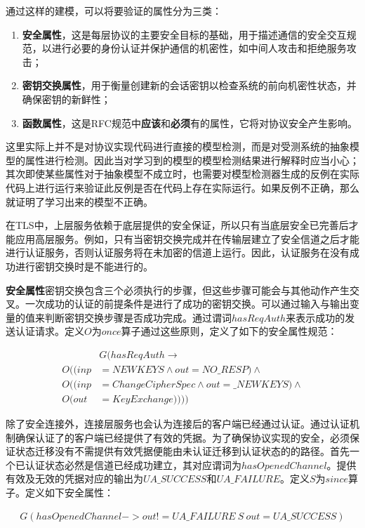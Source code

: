 通过这样的建模，可以将要验证的属性分为三类：
\begin{enumerate}
\item \textbf{安全属性}，这是每层协议的主要安全目标的基础，用于描述通信的安全交互规范，以进行必要的身份认证并保护通信的机密性，如中间人攻击和拒绝服务攻击；
\item \textbf{密钥交换属性}，用于衡量创建新的会话密钥以检查系统的前向机密性状态，并确保密钥的新鲜性；
\item \textbf{函数属性}，这是RFC规范中\textbf{应该}和\textbf{必须}有的属性，它将对协议安全产生影响。
\end{enumerate}

这里实际上并不是对协议实现代码进行直接的模型检测，而是对受测系统的抽象模型的属性进行检测。因此当对学习到的模型的模型检测结果进行解释时应当小心；其次即使某些属性对于抽象模型不成立时，也需要对模型检测器生成的反例在实际代码上进行运行来验证此反例是否在代码上存在实际运行。如果反例不正确，那么就证明了学习出来的模型不正确。

在TLS中，上层服务依赖于底层提供的安全保证，所以只有当底层安全已完善后才能应用高层服务。例如，只有当密钥交换完成并在传输层建立了安全信道之后才能进行认证服务，否则认证服务将在未加密的信道上运行。因此，认证服务在没有成功进行密钥交换时是不能进行的。

\textbf{安全属性}密钥交换包含三个必须执行的步骤，但这些步骤可能会与其他动作产生交叉。一次成功的认证的前提条件是进行了成功的密钥交换。可以通过输入与输出变量的值来判断密钥交换步骤是否成功完成。通过谓词$hasReqAuth$来表示成功的发送认证请求。定义$O$为$once$算子通过这些原则，定义了如下的安全属性规范：
\begin{PROPERTY}
\[
\begin{aligned}
&G( hasReqAuth  \rightarrow \\
O( (inp &= NEWKEYS \wedge out = NO\_RESP) \wedge \\
O( (inp &= ChangeCipherSpec \wedge out = \_NEWKEYS)\wedge \\
O(out &= KeyExchange))))
\end{aligned}
\]
\end{PROPERTY}

除了安全连接外，连接层服务也会认为连接后的客户端已经通过认证。通过认证机制确保认证了的客户端已经提供了有效的凭据。为了确保协议实现的安全，必须保证状态迁移没有不需提供有效凭据便能由未认证迁移到认证状态的的路径。首先一个已认证状态必然是信道已经成功建立，其对应谓词为$hasOpenedChannel$。提供有效及无效的凭据对应的输出为$UA\_SUCCESS$和$UA\_FAILURE$。定义$S$为$since$算子。定义如下安全属性：
\begin{PROPERTY}
\[
\begin{aligned}
G (hasOpenedChannel  ->
out!= UA\_FAILURE\ S\ out = UA\_SUCCESS)
\end{aligned}
\]
\end{PROPERTY}

